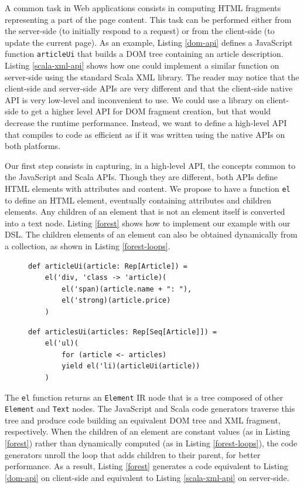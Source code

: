 \documentclass{llncs}
\newcommand{\code}[1]{\lstinline[language=Scala,columns=fixed,basicstyle=\footnotesize]|#1|}
\begin{document}
A common task in Web applications consists in computing HTML fragments representing a part of the
page content. This task can be performed either from the server-side (to initially respond to a
request) or from the client-side (to update the current page). As an example, Listing \ref{dom-api}
defines a JavaScript function \code{articleUi} that builds a DOM tree containing an article
description. Listing \ref{scala-xml-api} shows how one could implement a similar function on server-side using the standard Scala XML library. The reader may notice that the client-side and server-side APIs are very different and that the client-side native API is very low-level and inconvenient to use. We could use a library on client-side to get a higher level API for DOM fragment creation, but that would decrease the runtime performance. Instead, we want to define a high-level API that compiles to code as efficient as if it was written using the native APIs on both platforms.

Our first step consists in capturing, in a high-level API, the concepts common to the JavaScript and
Scala APIs. Though they are different, both APIs define HTML elements with attributes and content.
We propose to have a function \code{el} to define an HTML element, eventually containing attributes
and children elements. Any children of an element that is not an element itself is converted into a
text node. Listing \ref{forest} shows how to implement our example with our DSL. The children
elements of an element can also be obtained dynamically from a collection, as shown in Listing
\ref{forest-loops}.

\begin{figure}[htb]
\begin{lstlisting}[label=forest,caption=DOM definition DSL]
def articleUi(article: Rep[Article]) =
    el('div, 'class -> 'article)(
        el('span)(article.name + ": "),
        el('strong)(article.price)
    )
\end{lstlisting}
\end{figure}

\begin{figure}[htb]
\begin{lstlisting}[label=forest-loops,caption=Using loops]
def articlesUi(articles: Rep[Seq[Article]]) =
    el('ul)(
        for (article <- articles)
        yield el('li)(articleUi(article))
    )
\end{lstlisting}
\end{figure}

The \code{el} function returns an \code{Element} IR node that is a tree composed of other
\code{Element} and \code{Text} nodes. The JavaScript and Scala code generators traverse this tree
and produce code building an equivalent DOM tree and XML fragment, respectively. When the children
of an element are constant values (as in Listing \ref{forest}) rather than dynamically computed (as
in Listing \ref{forest-loops}), the code generators unroll the loop that adds children to their
parent, for better performance. As a result, Listing \ref{forest} generates a code equivalent to
Listing \ref{dom-api} on client-side and equivalent to Listing \ref{scala-xml-api} on server-side.
\end{document}
